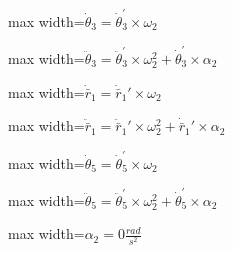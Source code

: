 \documentclass[11pt,a4paper]{article}
\begin{document}
\begin{center}\begin{adjustbox}{max width=\linewidth}$\displaystyle {\dot{\theta }}_{3}={\dot{\theta }}_{3}^{'}\times {\omega }_{2}$\end{adjustbox}\end{center}

\begin{center}\begin{adjustbox}{max width=\linewidth}$\displaystyle {\ddot{\theta }}_{3}={\ddot{\theta }}_{3}^{'}\times {\omega }_{2}^{2}+{\dot{\theta }}_{3}^{'}\times {\alpha }_{2}$\end{adjustbox}\end{center}

\begin{center}\begin{adjustbox}{max width=\linewidth}$\displaystyle {\dot{\bar{r}}}_{1}={\dot{\bar{r}}}_{1}'\times {\omega }_{2}$\end{adjustbox}\end{center}

\begin{center}\begin{adjustbox}{max width=\linewidth}$\displaystyle {\ddot{\bar{r}}}_{1}={\ddot{\bar{r}}}_{1}'\times {\omega }_{2}^{2}+{\dot{\bar{r}}}_{1}'\times {\alpha }_{2}$\end{adjustbox}\end{center}

\begin{center}\begin{adjustbox}{max width=\linewidth}$\displaystyle {\dot{\theta }}_{5}={\dot{\theta }}_{5}^{'}\times {\omega }_{2}$\end{adjustbox}\end{center}

\begin{center}\begin{adjustbox}{max width=\linewidth}$\displaystyle {\ddot{\theta }}_{5}={\ddot{\theta }}_{5}^{'}\times {\omega }_{2}^{2}+{\dot{\theta }}_{5}^{'}\times {\alpha }_{2}$\end{adjustbox}\end{center}

\begin{center}\begin{adjustbox}{max width=\linewidth}$\displaystyle {\alpha }_{2}=0\frac{rad}{{s}^{2}}$\end{adjustbox}\end{center}
\end{document}
